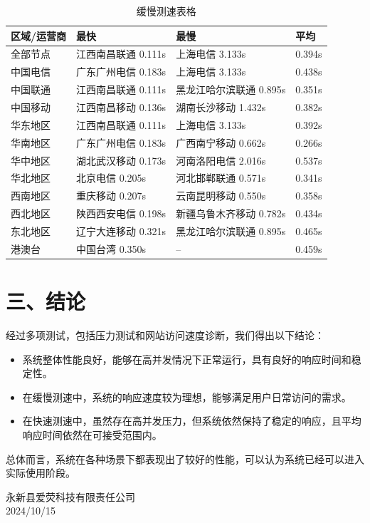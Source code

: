 \documentclass{article}
\begin{document}
\begin{table}[H]
    \centering
    \begin{tabular}{|l|l|l|l|}
        \hline
        \textbf{区域/运营商} & \textbf{最快} & \textbf{最慢} & \textbf{平均} \\ \hline
        全部节点 & 江西南昌联通 0.111s & 上海电信 3.133s & 0.394s \\ \hline
        中国电信 & 广东广州电信 0.183s & 上海电信 3.133s & 0.438s \\ \hline
        中国联通 & 江西南昌联通 0.111s & 黑龙江哈尔滨联通 0.895s & 0.351s \\ \hline
        中国移动 & 江西南昌移动 0.136s & 湖南长沙移动 1.432s & 0.382s \\ \hline
        华东地区 & 江西南昌联通 0.111s & 上海电信 3.133s & 0.392s \\ \hline
        华南地区 & 广东广州电信 0.183s & 广西南宁移动 0.662s & 0.266s \\ \hline
        华中地区 & 湖北武汉移动 0.173s & 河南洛阳电信 2.016s & 0.537s \\ \hline
        华北地区 & 北京电信 0.205s & 河北邯郸联通 0.571s & 0.341s \\ \hline
        西南地区 & 重庆移动 0.207s & 云南昆明移动 0.550s & 0.358s \\ \hline
        西北地区 & 陕西西安电信 0.198s & 新疆乌鲁木齐移动 0.782s & 0.434s \\ \hline
        东北地区 & 辽宁大连移动 0.321s & 黑龙江哈尔滨联通 0.895s & 0.465s \\ \hline
        港澳台 & 中国台湾 0.350s & -- & 0.459s \\ \hline
    \end{tabular}
    \caption{缓慢测速表格}
\end{table}

\section*{三、结论}
经过多项测试，包括压力测试和网站访问速度诊断，我们得出以下结论：
\begin{itemize}
    \item 系统整体性能良好，能够在高并发情况下正常运行，具有良好的响应时间和稳定性。
    \item 在缓慢测速中，系统的响应速度较为理想，能够满足用户日常访问的需求。
    \item 在快速测速中，虽然存在高并发压力，但系统依然保持了稳定的响应，且平均响应时间依然在可接受范围内。
\end{itemize}

总体而言，系统在各种场景下都表现出了较好的性能，可以认为系统已经可以进入实际使用阶段。\\
\vspace{2cm} %


\begin{flushright}
    \parbox{20em}{
    \raggedleft             %
    永新县爱荧科技有限责任公司 \\
    

    2024/10/15
    }
\end{flushright}
\end{document}
